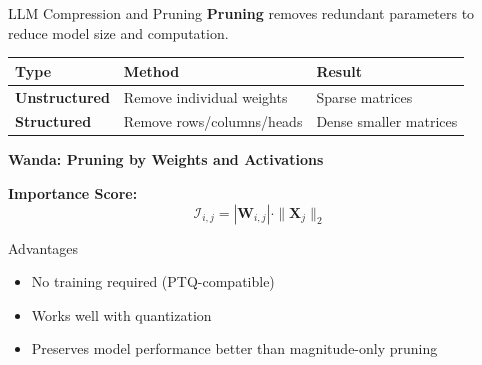 \documentclass[aspectratio=169,10pt]{beamer}
\begin{document}
\begin{frame}{LLM Compression and Pruning}
    \textbf{Pruning} removes redundant parameters to reduce model size and computation.

    \vspace{0.3cm}
    \begin{table}
        \centering
        \small
        \begin{tabular}{lll}
            \toprule
            \textbf{Type} & \textbf{Method} & \textbf{Result} \\
            \midrule
            \textbf{Unstructured} & Remove individual weights & Sparse matrices \\
            \textbf{Structured} & Remove rows/columns/heads & Dense smaller matrices \\
            \bottomrule
        \end{tabular}
    \end{table}

    \vspace{0.5cm}
    \textbf{Wanda: Pruning by Weights and Activations}

    \vspace{0.2cm}
    \textbf{Importance Score:}
    $$\mathcal{I}_{i,j} = |\mathbf{W}_{i,j}| \cdot \|\mathbf{X}_j\|_2$$

    \vspace{0.3cm}
    \begin{block}{Advantages}
        \begin{itemize}
            \item No training required (PTQ-compatible)
            \item Works well with quantization
            \item Preserves model performance better than magnitude-only pruning
        \end{itemize}
    \end{block}
\end{frame}
\end{document}
